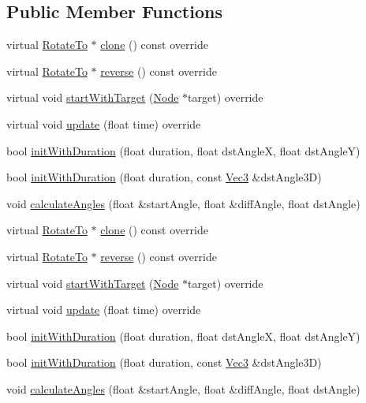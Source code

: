 \subsection*{Public Member Functions}
\begin{DoxyCompactItemize}
\item 
virtual \hyperlink{classRotateTo}{Rotate\+To} $\ast$ \hyperlink{classRotateTo_aa9e32e5c6c1975c40e55a7f29a11a082}{clone} () const override
\item 
virtual \hyperlink{classRotateTo}{Rotate\+To} $\ast$ \hyperlink{classRotateTo_aa33593a0fb9f174ed68ebcf15432a005}{reverse} () const override
\item 
virtual void \hyperlink{classRotateTo_a6d31ab7382b1d028b533d89dd1ca1980}{start\+With\+Target} (\hyperlink{classNode}{Node} $\ast$target) override
\item 
virtual void \hyperlink{classRotateTo_a2373d42f88a808956eacc7c50c1121c1}{update} (float time) override
\item 
bool \hyperlink{classRotateTo_af37750b148cb71442b29888f3dafd9a8}{init\+With\+Duration} (float duration, float dst\+AngleX, float dst\+AngleY)
\item 
bool \hyperlink{classRotateTo_a905c81a24bdfa502fd0cdeb86b75f037}{init\+With\+Duration} (float duration, const \hyperlink{classVec3}{Vec3} \&dst\+Angle3D)
\item 
void \hyperlink{classRotateTo_a1f92283615886e098e6b755f3e520ee3}{calculate\+Angles} (float \&start\+Angle, float \&diff\+Angle, float dst\+Angle)
\item 
virtual \hyperlink{classRotateTo}{Rotate\+To} $\ast$ \hyperlink{classRotateTo_abab0b58d6ee4fa4684c6847f251edc6b}{clone} () const override
\item 
virtual \hyperlink{classRotateTo}{Rotate\+To} $\ast$ \hyperlink{classRotateTo_a5bf82cc4eb140e90ff0e2da8b8dd7a7f}{reverse} () const override
\item 
virtual void \hyperlink{classRotateTo_aa09f9ac166119be0fa34d3a97261fc3a}{start\+With\+Target} (\hyperlink{classNode}{Node} $\ast$target) override
\item 
virtual void \hyperlink{classRotateTo_aa70e5807807b646fb4ff72091077e894}{update} (float time) override
\item 
bool \hyperlink{classRotateTo_af37750b148cb71442b29888f3dafd9a8}{init\+With\+Duration} (float duration, float dst\+AngleX, float dst\+AngleY)
\item 
bool \hyperlink{classRotateTo_a905c81a24bdfa502fd0cdeb86b75f037}{init\+With\+Duration} (float duration, const \hyperlink{classVec3}{Vec3} \&dst\+Angle3D)
\item 
void \hyperlink{classRotateTo_a1f92283615886e098e6b755f3e520ee3}{calculate\+Angles} (float \&start\+Angle, float \&diff\+Angle, float dst\+Angle)
\end{DoxyCompactItemize}

